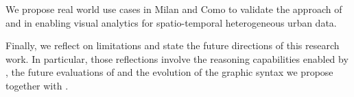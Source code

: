 We propose real world use cases in Milan and Como to validate the approach of \frappe{} and \river{} in enabling visual analytics for spatio-temporal heterogeneous urban data.

Finally, we reflect on limitations and state the future directions of this research work.
In particular, those reflections involve the reasoning capabilities enabled by \frappe{}, the future evaluations of \river{} and the evolution of the graphic syntax we propose together with \river{}.



